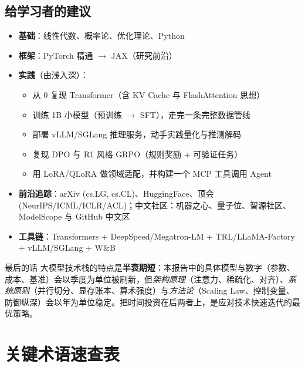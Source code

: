 \documentclass[12pt,a4paper]{article}
\begin{document}
\subsection{给学习者的建议}

\begin{itemize}
  \item \textbf{基础}：线性代数、概率论、优化理论、Python
  \item \textbf{框架}：PyTorch 精通 $\to$ JAX（研究前沿）
  \item \textbf{实践}（由浅入深）：
  \begin{itemize}
    \item 从 0 复现 Transformer（含 KV Cache 与 FlashAttention 思想）
    \item 训练 1B 小模型（预训练 $\to$ SFT），走完一条完整数据管线
    \item 部署 vLLM/SGLang 推理服务，动手实践量化与推测解码
    \item 复现 DPO 与 R1 风格 GRPO（规则奖励 + 可验证任务）
    \item 用 LoRA/QLoRA 做领域适配，并构建一个 MCP 工具调用 Agent
  \end{itemize}
  \item \textbf{前沿追踪}：arXiv (cs.LG, cs.CL)、HuggingFace、顶会 (NeurIPS/ICML/ICLR/ACL)；中文社区：机器之心、量子位、智源社区、ModelScope 与 GitHub 中文区
  \item \textbf{工具链}：Transformers + \allowbreak{}DeepSpeed/Megatron-LM + \allowbreak{}TRL/LLaMA-Factory + \allowbreak{}vLLM/SGLang + \allowbreak{}W\&B
\end{itemize}

\begin{infobox}{最后的话}
大模型技术栈的特点是\textbf{半衰期短}：本报告中的具体模型与数字（参数、成本、基准）会以季度为单位被刷新，但\emph{架构原理}（注意力、稀疏化、对齐）、\emph{系统原则}（并行切分、显存账本、算术强度）与\emph{方法论}（Scaling Law、控制变量、防御纵深）会以年为单位稳定。把时间投资在后两者上，是应对技术快速迭代的最优策略。
\end{infobox}

\newpage
\appendix
\section{关键术语速查表}
\end{document}
